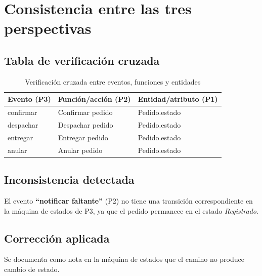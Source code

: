 \documentclass[11pt,a4paper]{article}
\begin{document}
\section{Consistencia entre las tres perspectivas}

\subsection*{Tabla de verificación cruzada}

\begin{table}[h!]
\centering

\begin{tabular}{lll}

\toprule

\textbf{Evento (P3)}
&
\textbf{Función/acción (P2)}
&
\textbf{Entidad/atributo (P1)}
\\

\midrule

confirmar
&
Confirmar pedido
&
Pedido.estado
\\

despachar
&
Despachar pedido
&
Pedido.estado
\\

entregar
&
Entregar pedido
&
Pedido.estado
\\

anular
&
Anular pedido
&
Pedido.estado
\\

\bottomrule

\end{tabular}

\caption{Verificación cruzada entre eventos, funciones y entidades}

\end{table}


\subsection*{Inconsistencia detectada}

El evento \textbf{``notificar faltante''} (P2) no tiene una transición correspondiente en la
máquina de estados de P3, ya que el pedido permanece en el estado \emph{Registrado}.

\subsection*{Corrección aplicada}

Se documenta como nota en la máquina de estados que el camino no produce cambio de estado.
\end{document}
